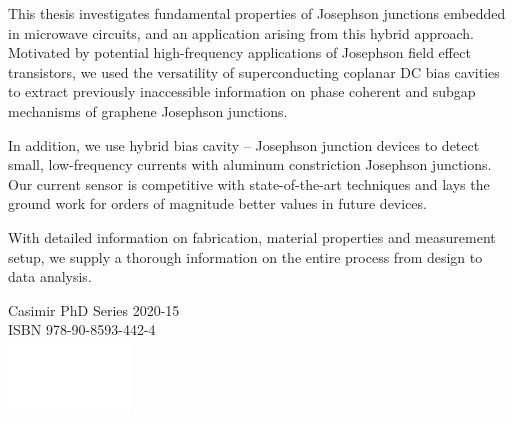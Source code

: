 \documentclass{dissertation-edit}
\begin{document}
\vspace*{1cm}

\Large

\noindent This thesis investigates fundamental properties of Josephson junctions embedded in microwave circuits, and an application arising from this hybrid approach.
%
Motivated by potential high-frequency applications of Josephson field effect transistors, we used the versatility of superconducting coplanar DC bias cavities to extract previously inaccessible information on phase coherent and subgap mechanisms of graphene Josephson junctions.

\noindent \newline
In addition, we use hybrid bias cavity -- Josephson junction devices to detect small, low-frequency currents with aluminum constriction Josephson junctions.
%
Our current sensor is competitive with state-of-the-art techniques and lays the ground work for orders of magnitude better values in future devices.

\noindent \newline
With detailed information on fabrication, material properties and measurement setup, we supply a thorough  information on the entire process from design to data analysis.

\vspace{3cm}\noindent\newline\centering
Casimir PhD Series 2020-15\\
ISBN 978-90-8593-442-4\\
\includegraphics[height=2cm]{TU_P5_white}
\end{document}
